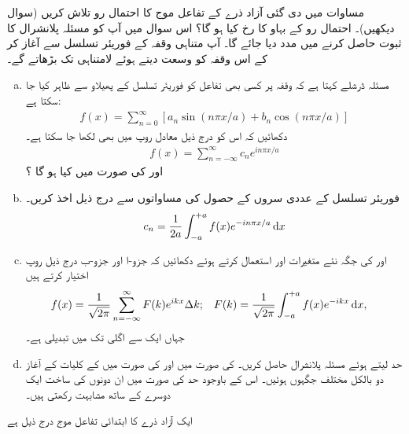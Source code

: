 مساوات  میں دی گئی آزاد ذرے کے تفاعل موج کا احتمال رو  تلاش کریں (سوال  دیکھیں)۔ احتمال رو کے بہاو کا رخ کیا ہو گا؟
اس سوال میں آپ کو مسئلہ پلانشرال کا ثبوت حاصل کرنے میں مدد دیا جائے گا۔ آپ متناہی وقفہ کے فوریئر تسلسل سے آغاز کر کے اس وقفہ کو وسعت دیتے ہوئے لامتناہی تک بڑھاتے گے۔ 

\begin{enumerate}[a. ]
\item 
مسئلہ ڈرشلے کہتا ہے کہ وقفہ  پر کسی بھی تفاعل   کو فوریئر تسلسل کے پھیلاو سے ظاہر کیا جا سکتا ہے:
\begin{align*}
f(x) = \sum_{n=0}^{\infty} [ a_{n}\sin(  n\pi x/a )  + b_{n}\cos(  n\pi x/a )]
\end{align*}
دکھائیں کہ اس کو درج ذیل معادل روپ میں بھی لکھا جا سکتا ہے۔
\begin{align*}
f(x) = \sum_{n=-\infty}^{\infty} c_{n}e^{i n \pi x /a }
\end{align*}
 اور   کی صورت میں  کیا ہو گا ؟
 \item
 فوریئر تسلسل کے عددی سروں کے حصول کی مساواتوں سے درج ذیل اخذ کریں۔
\begin{align*}
c_{n} = \frac{1}{2a} \int_{-a}^{+a} f(x)e^{-in\pi x/a} \dif x
\end{align*}
\item
{}  اور   کی جگہ نئے متغیرات   اور 
  استعمال کرتے ہوئے  دکھائیں کہ جزو-ا اور جزو-ب درج ذیل روپ اختیار کرتے ہیں 
\begin{align*}
f(x) &= \frac{1}{\sqrt{2 \pi }} \sum_{n=-\infty}^{\infty} F(k)e^{ikx} \Delta k; && F(k) = \frac{1}{\sqrt{2\pi}} \int_{-a}^{+a} f(x) e^{-ikx} \dif x,
\end{align*}
جہاں ایک  سے اگلی  تک  میں تبدیلی   ہے۔ 
\item
حد   لیتے ہوئے مسئلہ پلانشرال حاصل کریں۔    کی صورت میں  اور   کی صورت میں    کے کلیات کے آغاز دو بالکل مختلف جگہوں  ہوئیں۔  اس کے باوجود  حد  کی صورت میں ان دونوں کی ساخت ایک دوسرے کے ساتھ مشابہت رکھتی ہیں۔ 
\end{enumerate}
ایک آزاد ذرے کا ابتدائی تفاعل موج درج ذیل ہے 
